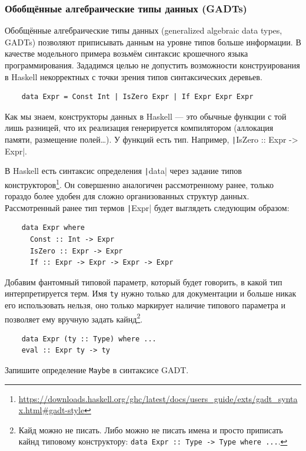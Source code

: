 \subsubsection{Обобщённые алгебраические типы данных (GADTs)} \label{subsubsec:gadts}

Обобщённые алгебраические типы данных (generalized algebraic data types, GADTs) позволяют приписывать данным на уровне типов больше информации.
В качестве модельного примера возьмём синтаксис крошечного языка программирования.
Зададимся целью не допустить возможности конструирования в Haskell некорректных с точки зрения типов синтаксических деревьев.
\begin{verbatim}
    data Expr = Const Int | IsZero Expr | If Expr Expr Expr
\end{verbatim}

Как мы знаем, конструкторы данных в Haskell --- это обычные функции с той лишь разницей, что их реализация генерируется компилятором (аллокация памяти, размещение полей\ldots).
У функций есть тип.
Например, \texttt|IsZero :: Expr -> Expr|.

В Haskell есть синтаксис определения \texttt|data| через задание типов конструкторов\footnote{\url{https://downloads.haskell.org/ghc/latest/docs/users_guide/exts/gadt_syntax.html\#gadt-style}}.
Он совершенно аналогичен рассмотренному ранее, только гораздо более удобен для сложно организованных структур данных.
Рассмотренный ранее тип термов \texttt|Expr| будет выглядеть следующим образом:
\begin{verbatim}
    data Expr where
      Const :: Int -> Expr
      IsZero :: Expr -> Expr
      If :: Expr -> Expr -> Expr -> Expr
\end{verbatim}

Добавим фантомный типовой параметр, который будет говорить, в какой тип интерпретируется терм.
Имя \texttt{ty} нужно только для документации и больше никак его использовать нельзя, оно только маркирует наличие типового параметра и позволяет ему вручную задать кайнд\footnote{Кайд можно не писать. Либо можно не писать имена и просто приписать кайнд типовому конструктору: \texttt{data Expr :: Type -> Type where ...}.}.
\begin{verbatim}
    data Expr (ty :: Type) where ...
    eval :: Expr ty -> ty
\end{verbatim}

\begin{task}
    Запишите определение \texttt{Maybe} в синтаксисе GADT.
\end{task}

